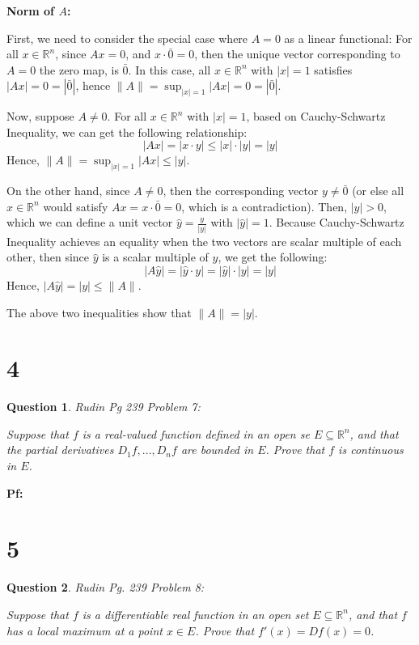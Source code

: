 \documentclass{article}
\newtheorem{question}{Question}
\begin{document}
\hfil

\textbf{Norm of $A$:}

First, we need to consider the special case where $A=0$ as a linear functional: For all $x\in\mathbb{R}^n$, since $Ax=0$, and $x\cdot \bar{0}=0$, then the unique vector corresponding to $A=0$ the zero map, is $\bar{0}$.
In this case, all $x\in\mathbb{R}^n$ with $|x|=1$ satisfies $|Ax|=0=|\bar{0}|$, hence $\|A\|=\sup_{|x|=1}|Ax|=0=|\bar{0}|$.

Now, suppose $A\neq 0$. For all $x\in\mathbb{R}^n$ with $|x|=1$, based on Cauchy-Schwartz Inequality, we can get the following relationship:
$$|Ax| = |x\cdot y|\leq |x|\cdot |y|=|y|$$
Hence, $\|A\|=\sup_{|x|=1}|Ax|\leq |y|$.

On the other hand, since $A\neq 0$, then the corresponding vector $y\neq\bar{0}$ (or else all $x\in\mathbb{R}^n$ would satisfy $Ax = x\cdot \bar{0}=0$, which is a contradiction). Then, $|y|>0$, which we can define a unit vector $\hat{y}=\frac{y}{|y|}$ with $|\hat{y}|=1$.
Because Cauchy-Schwartz Inequality achieves an equality when the two vectors are scalar multiple of each other, then since $\hat{y}$ is a scalar multiple of $y$, we get the following:
$$|A\hat{ y}|=|\hat{y}\cdot y| = |\hat{y}|\cdot |y|=|y|$$
Hence, $|A\hat{y}|=|y|\leq \|A\|$.

The above two inequalities show that $\|A\|=|y|$.

\break

\section*{4}
\begin{myBox}[]{}
    \begin{question}
        Rudin Pg 239 Problem 7:

        Suppose that $f$ is a real-valued function defined in an open se $E\subseteq \mathbb{R}^n$, and that the partial derivatives $D_1f, ..., D_nf$ are bounded in $E$.
        Prove that $f$ is continuous in $E$.
    \end{question}
\end{myBox}

\textbf{Pf:}

\break

\section*{5}
\begin{myBox}[]{}
    \begin{question}
        Rudin Pg. 239 Problem 8:

        Suppose that $f$ is a differentiable real function in an open set $E\subseteq \mathbb{R}^n$, 
        and that $f$ has a local maximum at a point $x\in E$. Prove that $f'(x)=Df(x)=0$.
    \end{question}
\end{myBox}
\end{document}
